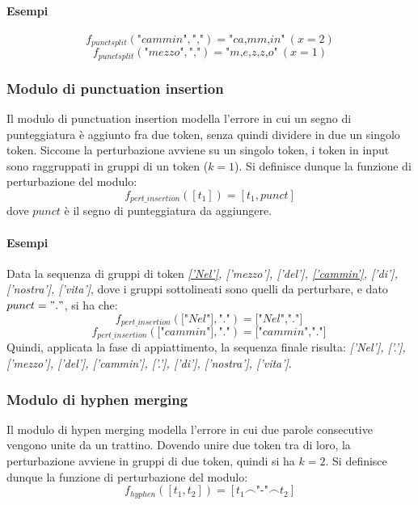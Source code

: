 \paragraph{Esempi}
\begin{equation}
f_{punctsplit}(\textit{"cammin"},\textit{","}) = \textit{"ca,mm,in"}\ (x = 2)
\end{equation}
\begin{equation}
f_{punctsplit}(\textit{"mezzo"},\textit{","}) = \textit{"m,e,z,z,o"}\ (x = 1)
\end{equation}


\subsubsection{Modulo di punctuation insertion}
Il modulo di punctuation insertion modella l'errore in cui un segno di punteggiatura è aggiunto fra due token, senza quindi dividere in due un singolo token.
Siccome la perturbazione avviene su un singolo token, i token in input sono raggruppati in gruppi di un token ($k = 1$). Si definisce dunque la funzione di perturbazione del modulo:
\begin{equation}
f_{pert\_insertion}([t_1]) = [t_1, punct]
\end{equation}
dove $punct$ è il segno di punteggiatura da aggiungere.
\paragraph{Esempi} Data la sequenza di gruppi di token \textit{\underline{['Nel']}, ['mezzo'], ['del'], \underline{['cammin']}, ['di'], ['nostra'], ['vita']}, dove i gruppi sottolineati sono quelli da perturbare, e dato $punct = "."$, si ha che:
\begin{equation}
f_{pert\_insertion}(\textit{["Nel"]},\textit{"."}) = \textit{["Nel","."]}\ 
\end{equation}
\begin{equation}
f_{pert\_insertion}(\textit{["cammin"]},\textit{"."}) = \textit{["cammin","."]}\ 
\end{equation}
Quindi, applicata la fase di appiattimento, la sequenza finale risulta: \textit{['Nel'], ['.'], ['mezzo'], ['del'], ['cammin'], ['.'], ['di'], ['nostra'], ['vita']}.

\subsubsection{Modulo di hyphen merging}
Il modulo di hypen merging modella l'errore in cui due parole consecutive vengono unite da un trattino. Dovendo unire due token tra di loro, la perturbazione avviene in gruppi di due token, quindi si ha $k = 2$. Si definisce dunque la funzione di perturbazione del modulo:
\begin{equation}
f_{hyphen}([t_1,t_2]) = [t_1\frown \textit{"-"} \frown t_2]
\end{equation}

